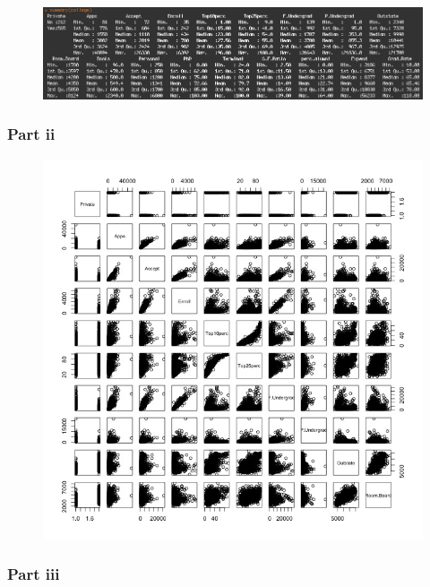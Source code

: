 \documentclass[11pt]{article}
\begin{document}
\begin{figure}[H]
	\centering
	\includegraphics[width=6.5in]{8ci.jpeg}
\end{figure}

\subsubsection*{Part ii}

\begin{figure}[H]
	\centering
	\includegraphics[width=5.5in]{8cii.jpeg}
\end{figure}

\subsubsection*{Part iii}
\end{document}
